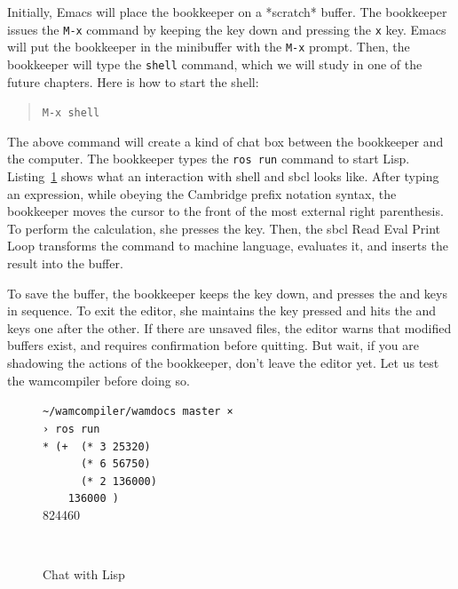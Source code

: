 \documentclass[a4paper,12pt]{book}
\newenvironment{fmpage}[1]
           {\begin{lrbox}{\fmbox}\begin{minipage}{#1}}
           {\end{minipage}\end{lrbox}\fbox{\usebox{\fmbox}}}
\begin{document}
Initially, Emacs will place the bookkeeper
on a *scratch* buffer. The bookkeeper issues
the \verb|M-x| command by keeping the 
key down and pressing the \verb|x| key.
Emacs will put the bookkeeper in the minibuffer
with the \verb|M-x| prompt. Then, the bookkeeper
will type the \verb|shell| command, which we
will study in one of the future chapters.
Here is how to start the shell:
\begin{quote}
\verb|M-x shell| 
\end{quote}
The above command will create a kind of chat
box between the bookkeeper and the computer.
The bookkeeper types the \verb|ros run| command
to start Lisp.  Listing~\ref{texan:photos} shows
what an interaction with shell and sbcl looks
like. After typing an expression, while obeying the
Cambridge prefix notation syntax,
the bookkeeper moves the cursor to the front
of the most external right parenthesis.
To perform the calculation, she presses
the  key. Then, the sbcl Read Eval
Print Loop transforms the command to machine
language, evaluates it, and inserts the result into
the buffer.

To save the buffer, the bookkeeper
keeps the  key down, and presses
the  and  keys in sequence.
To exit the editor, she maintains the 
key pressed and hits the  and 
keys one after the other. If there are unsaved files,
the editor warns that modified buffers exist,
and requires confirmation before quitting. But wait,
if you are shadowing the actions of the bookkeeper,
don't leave the editor yet. Let us test the wamcompiler
before doing so.

\begin{figure}[!h]
\begin{fmpage}{0.8\textwidth}
\verb|~/wamcompiler/wamdocs master ×|\\
\verb|› ros run|\\
\verb|* (+  (* 3 25320)|\\
\verb|      (* 6 56750)|\\
\verb|      (* 2 136000)|\\
\verb|    136000 )|\\ 
824460
\end{fmpage}
\begin{fmpage}{0.8\textwidth}
\verb| |
\end{fmpage}
\caption{Chat with Lisp}
\label{texan:photos}
\end{figure}
\end{document}
